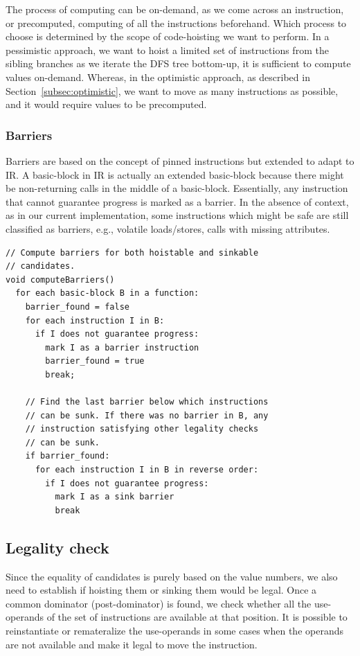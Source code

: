 \documentclass[sigplan,10pt,review,anonymous]{acmart}\settopmatter{printfolios=true,printccs=false,printacmref=false}
\begin{document}
The process of computing \GVN{} can be on-demand, as we come across an
instruction, or precomputed, computing \GVN{} of all the instructions
beforehand. Which process to choose is determined by the scope of code-hoisting
we want to perform. In a pessimistic approach, we want to hoist a limited set of
instructions from the sibling branches as we iterate the DFS tree bottom-up, it
is sufficient to compute \GVN{} values on-demand. Whereas, in the optimistic
approach, as described in Section~\ref{subsec:optimistic}, we want to move as
many instructions as possible, and it would require \GVN{} values to be
precomputed.

\subsubsection{Barriers}
\label{subsec:barriers}
Barriers are based on the concept of pinned instructions \cite{click1995global}
but extended to adapt to \LLVM{} IR. A basic-block in \LLVM{} IR is actually an
extended basic-block because there might be non-returning calls in the middle of
a basic-block. Essentially, any instruction that cannot guarantee progress is
marked as a barrier. In the absence of context, as in our current
implementation, some instructions which might be safe are still classified as
barriers, e.g., volatile loads/stores, calls with missing attributes.

\begin{verbatim}
// Compute barriers for both hoistable and sinkable
// candidates.
void computeBarriers()
  for each basic-block B in a function:
    barrier_found = false
    for each instruction I in B:
      if I does not guarantee progress:
        mark I as a barrier instruction
        barrier_found = true
        break;

    // Find the last barrier below which instructions
    // can be sunk. If there was no barrier in B, any
    // instruction satisfying other legality checks
    // can be sunk.
    if barrier_found:
      for each instruction I in B in reverse order:
        if I does not guarantee progress:
          mark I as a sink barrier
          break
\end{verbatim}

\subsection{Legality check}
\label{subsec:legality}
Since the equality of candidates is purely based on the value numbers, we also
need to establish if hoisting them or sinking them would be legal. Once a common
dominator (post-dominator) is found, we check whether all the use-operands of
the set of instructions are available at that position. It is possible to
reinstantiate or remateralize the use-operands in some cases when the operands
are not available and make it legal to move the instruction.
\end{document}
